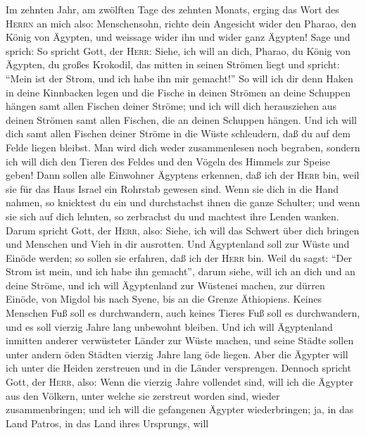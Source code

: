  Im zehnten Jahr, am zwölften Tage des zehnten Monats,
erging das Wort des \textsc{Herrn} an mich also: 
Menschensohn, richte dein Angesicht wider den Pharao, den König von
Ägypten, und weissage wider ihn und wider ganz Ägypten! 
Sage und sprich: So spricht Gott, der \textsc{Herr}: Siehe, ich will an
dich, Pharao, du König von Ägypten, du großes Krokodil, das mitten in
seinen Strömen liegt und spricht: ``Mein ist der Strom, und ich habe ihn
mir gemacht!''  So will ich dir denn Haken in deine
Kinnbacken legen und die Fische in deinen Strömen an deine Schuppen
hängen samt allen Fischen deiner Ströme; und ich will dich herausziehen
aus deinen Strömen samt allen Fischen, die an deinen Schuppen hängen.
 Und ich will dich samt allen Fischen deiner Ströme in die
Wüste schleudern, daß du auf dem Felde liegen bleibst. Man wird dich
weder zusammenlesen noch begraben, sondern ich will dich den Tieren des
Feldes und den Vögeln des Himmels zur Speise geben!  Dann
sollen alle Einwohner Ägyptens erkennen, daß ich der \textsc{Herr} bin,
weil sie für das Haus Israel ein Rohrstab gewesen sind. 
Wenn sie dich in die Hand nahmen, so knicktest du ein und durchstachst
ihnen die ganze Schulter; und wenn sie sich auf dich lehnten, so
zerbrachst du und machtest ihre Lenden wanken.  Darum
spricht Gott, der \textsc{Herr}, also: Siehe, ich will das Schwert über
dich bringen und Menschen und Vieh in dir ausrotten.  Und
Ägyptenland soll zur Wüste und Einöde werden; so sollen sie erfahren,
daß ich der \textsc{Herr} bin. Weil du sagst: ``Der Strom ist mein, und
ich habe ihn gemacht'',  darum siehe, will ich an dich
und an deine Ströme, und ich will Ägyptenland zur Wüstenei machen, zur
dürren Einöde, von Migdol bis nach Syene, bis an die Grenze Äthiopiens.
 Keines Menschen Fuß soll es durchwandern, auch keines
Tieres Fuß soll es durchwandern, und es soll vierzig Jahre lang
unbewohnt bleiben.  Und ich will Ägyptenland inmitten
anderer verwüsteter Länder zur Wüste machen, und seine Städte sollen
unter andern öden Städten vierzig Jahre lang öde liegen. Aber die
Ägypter will ich unter die Heiden zerstreuen und in die Länder
versprengen.  Dennoch spricht Gott, der \textsc{Herr},
also: Wenn die vierzig Jahre vollendet sind, will ich die Ägypter aus
den Völkern, unter welche sie zerstreut worden sind, wieder
zusammenbringen;  und ich will die gefangenen Ägypter
wiederbringen; ja, in das Land Patros, in das Land ihres Ursprungs, will
